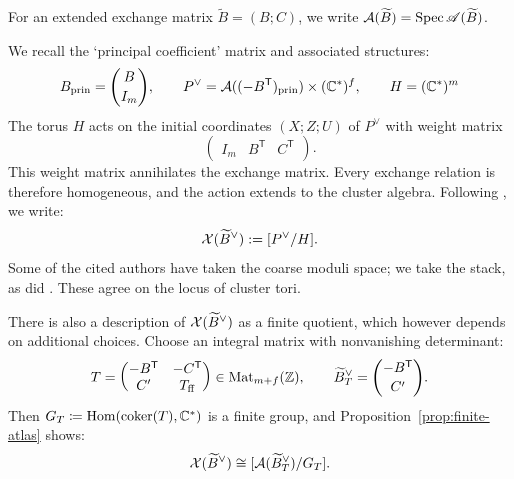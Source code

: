 \documentclass[12pt, letter]{amsart}
\theoremstyle{definition}
\begin{document}
For an extended exchange matrix $\widetilde B= (B;C)$, we write $\mathcal{A}(\widetilde B)=\operatorname{Spec}\mathscr{A}(\widetilde B)$. 

We recall the `principal coefficient' matrix and associated structures: 
\[
B_{\mathrm{prin}}=\binom B{I_m},\qquad
P^\vee=\mathcal{A}((-B^{\mathsf T})_{\mathrm{prin}})\times(\mathbb{C}^*)^f,
\qquad H=(\mathbb{C}^*)^m
\]
The torus $H$ acts on the initial coordinates $(X;Z;U)$ of $P^\vee$
with weight matrix
\begin{equation}
\label{eq:weights}
 \begin{pmatrix}
     I_m & B^{\mathsf T} & C^{\mathsf T}
 \end{pmatrix}.
\end{equation}
This weight matrix annihilates the exchange matrix. 
Every exchange relation is therefore homogeneous, and the action extends
to the  cluster algebra. Following \cite{FG09, FG06, GHK, GHKK}, we write:
\begin{equation}
\label{eq:canonical-mirror}
 \mathcal{X}(\widetilde B^\vee):=[P^\vee/H].
\end{equation}
Some of the cited  authors have taken the coarse moduli space; we take the stack, as did \cite{Goncharov-Shen}.  These agree on the locus of cluster tori. 

There is also a description of \(\mathcal{X}(\widetilde B^\vee)\) as a finite quotient, which however depends on additional choices.
Choose an integral matrix with nonvanishing determinant:
\begin{equation}\label{intro:algcompletion}
 T=\begin{pmatrix}-B^{\mathsf T}&-C^{\mathsf T}\\
 C'&T_{\rm ff}\end{pmatrix} \in \operatorname{Mat}_{m+f}(\mathbb{Z}),
 \qquad
 \widetilde B_T^\vee=\binom{-B^{\mathsf T}}{C'}.
\end{equation}
Then \(G_T \coloneqq \operatorname{Hom}(\operatorname{coker}(T), \mathbb{C}^*)\) is a finite group, and
 Proposition~\ref{prop:finite-atlas} shows:
\begin{equation}
\label{eq:intro_DM_mirror}
    \mathcal{X}(\widetilde B^\vee)\cong[\mathcal{A}(\widetilde B_T^\vee)/G_T].
\end{equation}
\end{document}
